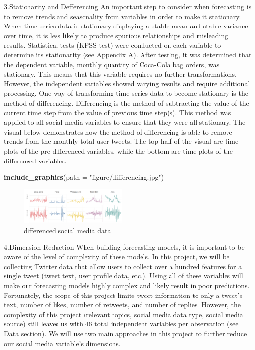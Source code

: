\documentclass[12pt,oneside]{chicagocapstone}
\newenvironment{Shaded}{\begin{snugshade}}{\end{snugshade}}
\newcommand{\KeywordTok}[1]{\textcolor[rgb]{0.13,0.29,0.53}{\textbf{#1}}}
\newcommand{\DataTypeTok}[1]{\textcolor[rgb]{0.13,0.29,0.53}{#1}}
\newcommand{\StringTok}[1]{\textcolor[rgb]{0.31,0.60,0.02}{#1}}
\newcommand{\NormalTok}[1]{#1}
\begin{document}
3.Stationarity and Defferencing An important step to consider when
forecasting is to remove trends and seasonality from variables in order
to make it stationary. When time series data is stationary displaying a
stable mean and stable variance over time, it is less likely to produce
spurious relationships and misleading results. Statistical tests (KPSS
test) were conducted on each variable to determine its stationarity (see
Appendix A). After testing, it was determined that the dependent
variable, monthly quantity of Coca-Cola bag orders, was stationary. This
means that this variable requires no further transformations. However,
the independent variables showed varying results and require additional
processing. One way of transforming time series data to become
stationary is the method of differencing. Differencing is the method of
subtracting the value of the current time step from the value of
previous time step(s). This method was applied to all social media
variables to ensure that they were all stationary. The visual below
demonstrates how the method of differencing is able to remove trends
from the monthly total user tweets. The top half of the visual are time
plots of the pre-differenced variables, while the bottom are time plots
of the differenced variables.
\begin{Shaded}
\begin{Highlighting}[]
\KeywordTok{include_graphics}\NormalTok{(}\DataTypeTok{path =} \StringTok{"figure/differencing.jpg"}\NormalTok{)}
\end{Highlighting}
\end{Shaded}
\begin{figure}

{\centering \includegraphics[width=200px]{figure/differencing} 

}

\caption{differenced social media data}\label{fig:differencing}
\end{figure}
4.Dimension Reduction When building forecasting models, it is important
to be aware of the level of complexity of these models. In this project,
we will be collecting Twitter data that allow users to collect over a
hundred features for a single tweet (tweet text, user profile data,
etc.). Using all of these variables will make our forecasting models
highly complex and likely result in poor predictions. Fortunately, the
scope of this project limits tweet information to only a tweet's text,
number of likes, number of retweets, and number of replies. However, the
complexity of this project (relevant topics, social media data type,
social media source) still leaves us with 46 total independent variables
per observation (see Data section). We will use two main approaches in
this project to further reduce our social media variable's dimensions.
\end{document}
